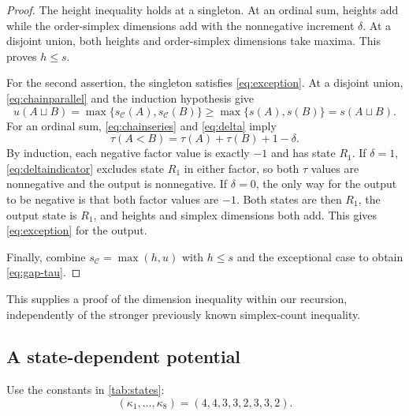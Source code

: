 \documentclass[11pt]{article}
\newtheorem{lemma}[theorem]{Lemma}
\theoremstyle{definition}
\newcommand{\OO}{\mathcal O}
\newcommand{\CC}{\mathcal C}
\newcommand{\sO}{s_{\OO}}
\newcommand{\sC}{s_{\CC}}
\newcommand{\SP}{\mathsf{SP}}
\begin{document}
\begin{proof}
The height inequality holds at a singleton. At an ordinal sum, heights add while the order-simplex dimensions add with the nonnegative increment $\delta$. At a disjoint union, both heights and order-simplex dimensions take maxima. This proves $h\le s$.

For the second assertion, the singleton satisfies \eqref{eq:exception}. At a disjoint union, \eqref{eq:chainparallel} and the induction hypothesis give
\[
u(A\sqcup B)=\max\{\sC(A),\sC(B)\}
\ge\max\{s(A),s(B)\}=s(A\sqcup B).
\]
For an ordinal sum, \eqref{eq:chainseries} and \eqref{eq:delta} imply
\begin{equation}\label{eq:tauseries}
\tau(A<B)=\tau(A)+\tau(B)+1-\delta.
\end{equation}
By induction, each negative factor value is exactly $-1$ and has state $R_1$. If $\delta=1$, \eqref{eq:deltaindicator} excludes state $R_1$ in either factor, so both $\tau$ values are nonnegative and the output is nonnegative. If $\delta=0$, the only way for the output to be negative is that both factor values are $-1$. Both states are then $R_1$, the output state is $R_1$, and heights and simplex dimensions both add. This gives \eqref{eq:exception} for the output.

Finally, combine $\sC=\max(h,u)$ with $h\le s$ and the exceptional case to obtain \eqref{eq:gap-tau}.
\end{proof}

This supplies a proof of the dimension inequality within our recursion, independently of the stronger previously known simplex-count inequality.

\subsection{A state-dependent potential}
Use the constants in \cref{tab:states}:
\begin{equation}\label{eq:kappa}
(\kappa_1,\ldots,\kappa_8)=(4,4,3,3,2,3,3,2).
\end{equation}
\end{document}
